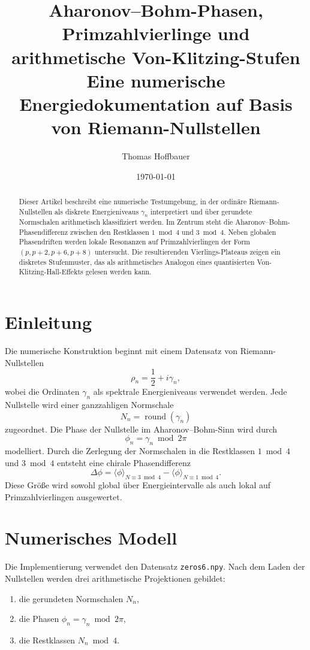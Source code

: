 \documentclass[11pt,a4paper]{article}
\title{\textbf{Aharonov--Bohm-Phasen, Primzahlvierlinge und arithmetische Von-Klitzing-Stufen}\\
\large Eine numerische Energiedokumentation auf Basis von Riemann-Nullstellen}
\author{Thomas Hoffbauer}
\date{\today}
\begin{document}
\maketitle

\begin{abstract}
Dieser Artikel beschreibt eine numerische Testumgebung, in der ordinäre Riemann-Nullstellen
als diskrete Energieniveaus $\gamma_n$ interpretiert und über gerundete Normschalen
arithmetisch klassifiziert werden. Im Zentrum steht die Aharonov--Bohm-Phasendifferenz
zwischen den Restklassen $1 \bmod 4$ und $3 \bmod 4$. Neben globalen Phasendriften werden
lokale Resonanzen auf Primzahlvierlingen der Form $(p,p+2,p+6,p+8)$ untersucht. Die
resultierenden Vierlings-Plateaus zeigen ein diskretes Stufenmuster, das als arithmetisches
Analogon eines quantisierten Von-Klitzing-Hall-Effekts gelesen werden kann.
\end{abstract}

\section{Einleitung}

Die numerische Konstruktion beginnt mit einem Datensatz von Riemann-Nullstellen
\[
  \rho_n = \frac12 + i\gamma_n,
\]
wobei die Ordinaten $\gamma_n$ als spektrale Energieniveaus verwendet werden. Jede
Nullstelle wird einer ganzzahligen Normschale
\[
  N_n = \operatorname{round}(\gamma_n)
\]
zugeordnet. Die Phase der Nullstelle im Aharonov--Bohm-Sinn wird durch
\[
  \phi_n = \gamma_n \bmod 2\pi
\]
modelliert. Durch die Zerlegung der Normschalen in die Restklassen $1 \bmod 4$ und
$3 \bmod 4$ entsteht eine chirale Phasendifferenz
\[
  \Delta\phi =
  \langle \phi\rangle_{N\equiv 3 \bmod 4}
  -
  \langle \phi\rangle_{N\equiv 1 \bmod 4}.
\]
Diese Größe wird sowohl global über Energieintervalle als auch lokal auf
Primzahlvierlingen ausgewertet.

\section{Numerisches Modell}

Die Implementierung verwendet den Datensatz \texttt{zeros6.npy}. Nach dem Laden der
Nullstellen werden drei arithmetische Projektionen gebildet:
\begin{enumerate}
  \item die gerundeten Normschalen $N_n$,
  \item die Phasen $\phi_n = \gamma_n \bmod 2\pi$,
  \item die Restklassen $N_n \bmod 4$.
\end{enumerate}
\end{document}
